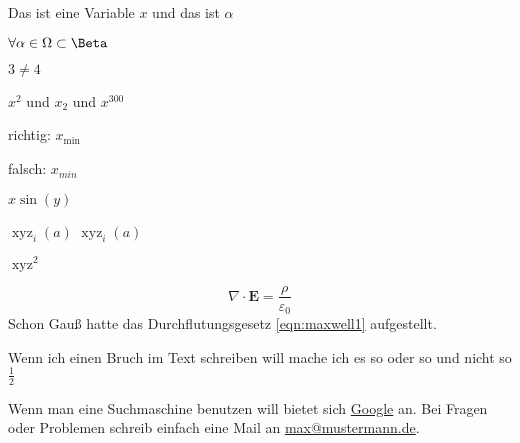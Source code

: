 \documentclass[titlepage = firstcover]{scrartcl}
\DeclareMathOperator{\f}{xyz}
\begin{document}
    
    Das ist eine Variable $x$ und das ist $\alpha$

    $\forall \alpha \in \Omega \subset \Beta$


    $3 \neq 4$

    $x^2$ und $x_2$ und $x^{300}$

    richtig: $x_\text{min}$
    
    falsch: $x_{min}$

    $x \sin (y)$

    $\operatorname{xyz}_i(a)$
    $\operatorname*{xyz}_i(a)$
    
    $\f^2$ 

    \begin{equation}
        \nabla \cdot \symbf{E} = \frac{\rho}{\varepsilon_0}
        \label{eqn:maxwell1}
    \end{equation}
    Schon Gauß hatte das Durchflutungsgesetz
    \eqref{eqn:maxwell1} aufgestellt.

    Wenn ich einen Bruch im Text schreiben will mache ich es so  oder so 
    und nicht so $\frac{1}{2}$

Wenn man eine Suchmaschine benutzen will bietet sich \href{www.google.de}{Google} an.
Bei Fragen oder Problemen schreib einfach eine Mail an \href{mailto:max@mustermann.de}{max@mustermann.de}.
 
    
\end{document}
